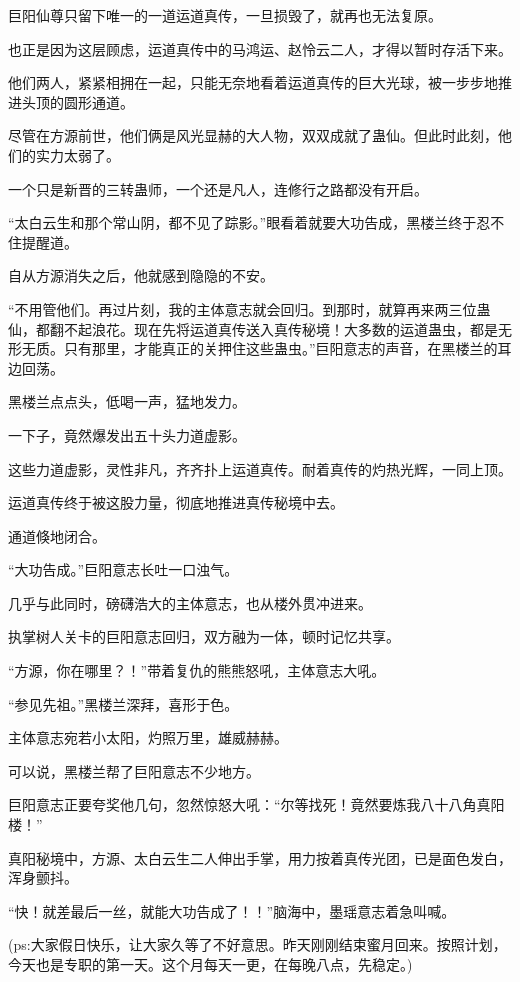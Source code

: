 \begin{this_body}
巨阳仙尊只留下唯一的一道运道真传，一旦损毁了，就再也无法复原。

也正是因为这层顾虑，运道真传中的马鸿运、赵怜云二人，才得以暂时存活下来。

他们两人，紧紧相拥在一起，只能无奈地看着运道真传的巨大光球，被一步步地推进头顶的圆形通道。

尽管在方源前世，他们俩是风光显赫的大人物，双双成就了蛊仙。但此时此刻，他们的实力太弱了。

一个只是新晋的三转蛊师，一个还是凡人，连修行之路都没有开启。

“太白云生和那个常山阴，都不见了踪影。”眼看着就要大功告成，黑楼兰终于忍不住提醒道。

自从方源消失之后，他就感到隐隐的不安。

“不用管他们。再过片刻，我的主体意志就会回归。到那时，就算再来两三位蛊仙，都翻不起浪花。现在先将运道真传送入真传秘境！大多数的运道蛊虫，都是无形无质。只有那里，才能真正的关押住这些蛊虫。”巨阳意志的声音，在黑楼兰的耳边回荡。

黑楼兰点点头，低喝一声，猛地发力。

一下子，竟然爆发出五十头力道虚影。

这些力道虚影，灵性非凡，齐齐扑上运道真传。耐着真传的灼热光辉，一同上顶。

运道真传终于被这股力量，彻底地推进真传秘境中去。

通道倏地闭合。

“大功告成。”巨阳意志长吐一口浊气。

几乎与此同时，磅礴浩大的主体意志，也从楼外贯冲进来。

执掌树人关卡的巨阳意志回归，双方融为一体，顿时记忆共享。

“方源，你在哪里？！”带着复仇的熊熊怒吼，主体意志大吼。

“参见先祖。”黑楼兰深拜，喜形于色。

主体意志宛若小太阳，灼照万里，雄威赫赫。

可以说，黑楼兰帮了巨阳意志不少地方。

巨阳意志正要夸奖他几句，忽然惊怒大吼：“尔等找死！竟然要炼我八十八角真阳楼！”

真阳秘境中，方源、太白云生二人伸出手掌，用力按着真传光团，已是面色发白，浑身颤抖。

“快！就差最后一丝，就能大功告成了！！”脑海中，墨瑶意志着急叫喊。

(ps:大家假日快乐，让大家久等了不好意思。昨天刚刚结束蜜月回来。按照计划，今天也是专职的第一天。这个月每天一更，在每晚八点，先稳定。)

\end{this_body}

